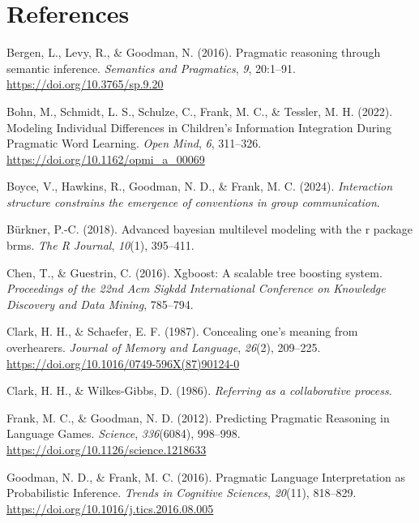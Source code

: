 \documentclass[10pt, letterpaper]{article}
\begin{document}
\section{References}\label{references}

\setlength{\parindent}{-0.1in} 
\setlength{\leftskip}{0.125in}

\noindent

\label{refs}
\begin{CSLReferences}{1}{0}
Bergen, L., Levy, R., \& Goodman, N. (2016). Pragmatic reasoning through
semantic inference. \emph{Semantics and Pragmatics}, \emph{9}, 20:1--91.
\url{https://doi.org/10.3765/sp.9.20}

Bohn, M., Schmidt, L. S., Schulze, C., Frank, M. C., \& Tessler, M. H.
(2022). Modeling {Individual Differences} in {Children}'s {Information
Integration During Pragmatic Word Learning}. \emph{Open Mind}, \emph{6},
311--326. \url{https://doi.org/10.1162/opmi_a_00069}

Boyce, V., Hawkins, R., Goodman, N. D., \& Frank, M. C. (2024).
\emph{Interaction structure constrains the emergence of conventions in
group communication}.

Bürkner, P.-C. (2018). Advanced bayesian multilevel modeling with the r
package brms. \emph{The R Journal}, \emph{10}(1), 395--411.

Chen, T., \& Guestrin, C. (2016). Xgboost: {A} scalable tree boosting
system. \emph{Proceedings of the 22nd Acm Sigkdd International
Conference on Knowledge Discovery and Data Mining}, 785--794.

Clark, H. H., \& Schaefer, E. F. (1987). Concealing one's meaning from
overhearers. \emph{Journal of Memory and Language}, \emph{26}(2),
209--225. \url{https://doi.org/10.1016/0749-596X(87)90124-0}

Clark, H. H., \& Wilkes-Gibbs, D. (1986). \emph{Referring as a
collaborative process}.

Frank, M. C., \& Goodman, N. D. (2012). Predicting {Pragmatic Reasoning}
in {Language Games}. \emph{Science}, \emph{336}(6084), 998--998.
\url{https://doi.org/10.1126/science.1218633}

Goodman, N. D., \& Frank, M. C. (2016). Pragmatic {Language
Interpretation} as {Probabilistic Inference}. \emph{Trends in Cognitive
Sciences}, \emph{20}(11), 818--829.
\url{https://doi.org/10.1016/j.tics.2016.08.005}


\end{CSLReferences}
\end{document}
